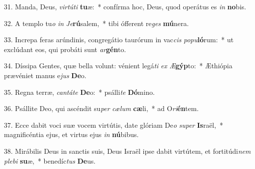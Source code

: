 31. Manda, Deus, \textit{vir}\textit{tú}\textit{ti} \textbf{tu}æ:~*  confírma hoc, Deus, quod operátus es \textit{in} \textbf{no}bis.\

32. A templo tu\textit{o} \textit{in} \textit{Je}\textbf{rú}salem,~*  tibi ófferent re\textit{ges} \textbf{mú}nera.\

33. Increpa feras arúndinis, congregátio taurórum in vac\textit{cis} \textit{po}\textit{pu}\textbf{ló}rum:~*  ut exclúdant eos, qui probáti sunt \textit{ar}\textbf{gén}to.\

34. Díssipa Gentes, quæ bella volunt: vénient legá\textit{ti} \textit{ex} \textit{Æ}\textbf{gýp}to:~*  Æthiópia prævéniet manus e\textit{jus} \textbf{De}o.\

35. Regna terræ, \textit{can}\textit{tá}\textit{te} \textbf{De}o:~*  psálli\textit{te} \textbf{Dó}mino.\

36. Psállite Deo, qui ascéndit su\textit{per} \textit{cæ}\textit{lum} \textbf{cæ}li,~*  ad O\textit{ri}\textbf{én}tem.\

37. Ecce dabit voci suæ vocem virtútis, date glóriam De\textit{o} \textit{su}\textit{per} \textbf{Is}raël,~*  magnificéntia ejus, et virtus ejus \textit{in} \textbf{nú}bibus.\

38. Mirábilis Deus in sanctis suis, Deus Israël ipse dabit virtútem, et fortitúdi\textit{nem} \textit{ple}\textit{bi} \textbf{su}æ,~*  benedíc\textit{tus} \textbf{De}us.\

